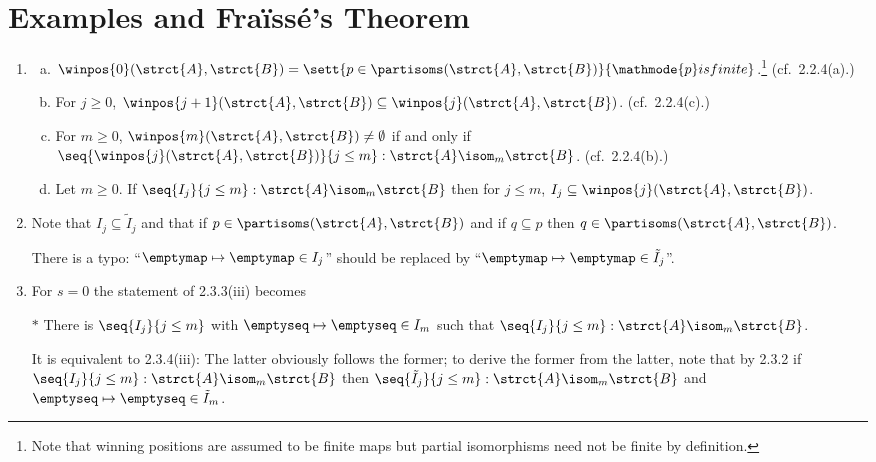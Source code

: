 \section{Examples and Fra\"{i}ss\'{e}'s Theorem}
\begin{enumerate}[1.]
%
\item {} \begin{enumerate}[(a)]
\item $\winpos{0}(\strct{A}, \strct{B}) = \sett{p \in \partisoms(\strct{A}, \strct{B})}{\mathmode{p} is finite}$.\footnote{Note that winning positions are assumed to be finite maps but partial isomorphisms need not be finite by definition.} (cf.\ 2.2.4(a).)
\item For $j \geq 0$, $\winpos{j + 1}(\strct{A}, \strct{B}) \subseteq \winpos{j}(\strct{A}, \strct{B})$. (cf.\ 2.2.4(c).)
\item For $m \geq 0$, $\winpos{m}(\strct{A}, \strct{B}) \neq \emptyset$ if and only if $\seq{\winpos{j}(\strct{A}, \strct{B})}{j \leq m}: \strct{A} \isom_m \strct{B}$. (cf.\ 2.2.4(b).)
\item Let $m \geq 0$. If $\seq{I_j}{j \leq m}: \strct{A} \isom_m \strct{B}$ then for $j \leq m$, $I_j \subseteq \winpos{j}(\strct{A}, \strct{B})$.
\end{enumerate}
%
\item {} Note that $I_j \subseteq \tilde{I}_j$ and that if $p \in \partisoms(\strct{A}, \strct{B})$ and if $q \subseteq p$ then $q \in \partisoms(\strct{A}, \strct{B})$.
\begin{remark}
There is a typo: ``$\emptymap \mapsto \emptymap \in I_j$'' should be replaced by ``$\emptymap \mapsto \emptymap \in \tilde{I}_j$''.
\end{remark}
%
\item {} For $s = 0$ the statement of 2.3.3(iii) becomes
\newpar
\begin{quoteno}{$\ast$}
There is $\seq{I_j}{j \leq m}$ with $\emptyseq \mapsto \emptyseq \in I_m$ such that $\seq{I_j}{j \leq m} : \strct{A} \isom_m \strct{B}$.
\end{quoteno}
\newpar
It is equivalent to 2.3.4(iii): The latter obviously follows the former; to derive the former from the latter, note that by 2.3.2 if $\seq{I_j}{j \leq m} : \strct{A} \isom_m \strct{B}$ then $\seq{\tilde{I}_j}{j \leq m} : \strct{A} \isom_m \strct{B}$ and $\emptyseq \mapsto \emptyseq \in \tilde{I}_m$.
\newpar

\end{enumerate}
